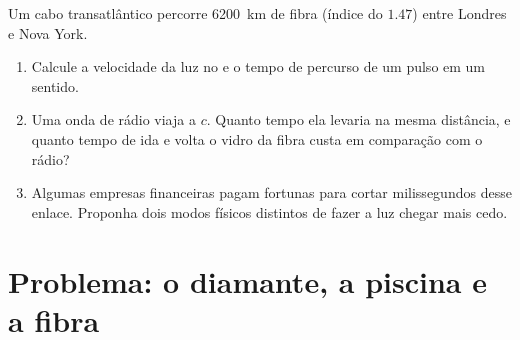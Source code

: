 \begin{exercise}[$\star\star\star$]\label{exo:g10:refraction:15}
Um cabo transatlântico percorre \qty{6200}{km} de fibra (índice do 
$1.47$) entre Londres e Nova York.
\begin{enumerate}
  \item Calcule a velocidade da luz no  e o tempo de percurso de um
        pulso em um sentido.
  \item Uma onda de rádio viaja a $c$. Quanto tempo ela levaria na mesma
        distância, e quanto tempo de ida e volta o vidro da fibra custa
        em comparação com o rádio?
  \item Algumas empresas financeiras pagam fortunas para cortar
        milissegundos desse enlace. Proponha dois modos físicos distintos
        de fazer a luz chegar mais cedo.
\end{enumerate}
\end{exercise}

\section{Problema: o diamante, a piscina e a fibra}

